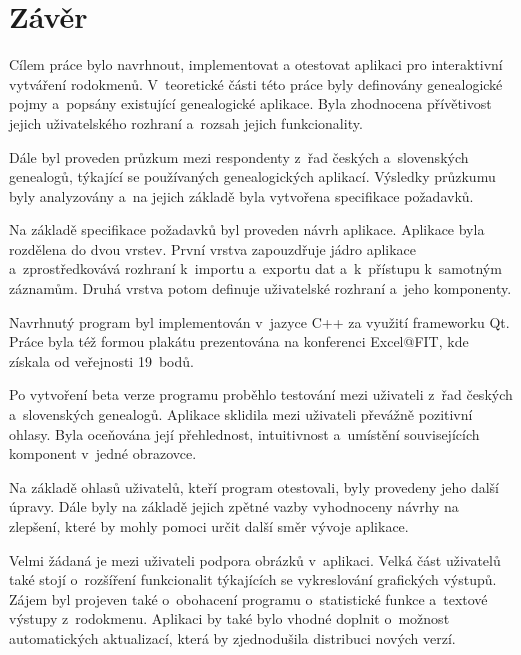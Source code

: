 
\chapter{Závěr}

Cílem práce bylo navrhnout, implementovat a otestovat aplikaci pro interaktivní vytváření rodokmenů. V~teoretické části této práce byly definovány genealogické pojmy a~popsány existující genealogické aplikace. Byla zhodnocena přívětivost jejich uživatelského rozhraní a~rozsah jejich funkcionality. \par
Dále byl proveden průzkum mezi respondenty z~řad českých a~slovenských genealogů, týkající se používaných genealogických aplikací. Výsledky průzkumu byly analyzovány a~na jejich základě byla vytvořena specifikace požadavků.\par
Na základě specifikace požadavků byl proveden návrh aplikace. Aplikace byla rozdělena do dvou vrstev. První vrstva zapouzdřuje jádro aplikace a~zprostředkovává rozhraní k~importu a~exportu dat a~k~přístupu k~samotným záznamům. Druhá vrstva potom definuje uživatelské rozhraní a~jeho komponenty.\par
Navrhnutý program byl implementován v~jazyce C++ za využití frameworku Qt. Práce byla též formou plakátu prezentována na konferenci Excel@FIT, kde získala od veřejnosti 19~bodů. \par
Po vytvoření beta verze programu proběhlo testování mezi uživateli z~řad českých a~slovenských genealogů. Aplikace sklidila mezi uživateli převážně pozitivní ohlasy. Byla oceňována její přehlednost, intuitivnost a~umístění souvisejících komponent v~jedné obrazovce.  \par
Na základě ohlasů uživatelů, kteří program otestovali, byly provedeny jeho další úpravy. Dále byly na základě jejich zpětné vazby vyhodnoceny návrhy na zlepšení, které by mohly pomoci určit další směr vývoje aplikace.\par
Velmi žádaná je mezi uživateli podpora obrázků v~aplikaci. Velká část uživatelů také stojí o~rozšíření funkcionalit týkajících se vykreslování grafických výstupů. Zájem byl projeven také o~obohacení programu o~statistické funkce a~textové výstupy z~rodokmenu. Aplikaci by také bylo vhodné doplnit o~možnost automatických aktualizací, která by zjednodušila distribuci nových verzí.\par

